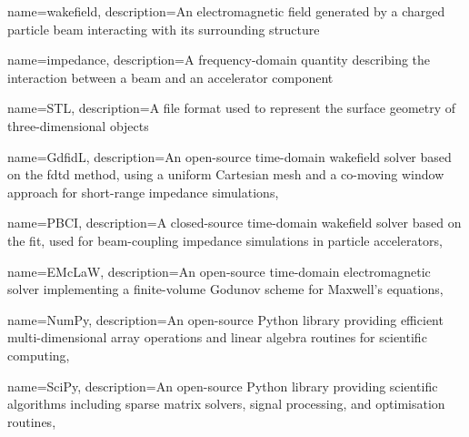 { name={wakefield}, description={An electromagnetic field generated by a charged particle beam interacting with its surrounding structure} }

{ name={impedance}, description={A frequency-domain quantity describing the interaction between a beam and an accelerator component} }

{ name={STL}, description={A file format used to represent the surface geometry of three-dimensional objects} }

{ name={GdfidL}, description={An open-source time-domain wakefield solver based on the \gls{fdtd} method, using a uniform Cartesian mesh and a co-moving window approach for short-range impedance simulations}, }

{ name={PBCI}, description={A closed-source time-domain wakefield solver based on the \gls{fit}, used for beam-coupling impedance simulations in particle accelerators}, }

{ name={EMcLaW}, description={An open-source time-domain electromagnetic solver implementing a finite-volume Godunov scheme for Maxwell's equations}, }

{ name={NumPy}, description={An open-source Python library providing efficient multi-dimensional array operations and linear algebra routines for scientific computing}, }

{ name={SciPy}, description={An open-source Python library providing scientific algorithms including sparse matrix solvers, signal processing, and optimisation routines}, }





